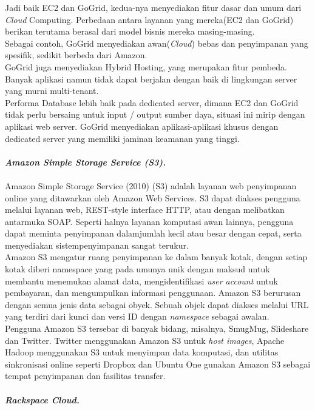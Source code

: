 Jadi baik EC2 dan GoGrid, kedua-nya menyediakan fitur dasar dan umum dari \textit{Cloud} Computing. Perbedaan antara layanan yang mereka(EC2 dan  GoGrid)  berikan  terutama berasal dari model bisnis mereka masing-masing.\\
Sebagai contoh, GoGrid menyediakan awan(\textit{Cloud}) bebas dan penyimpanan yang spesifik, sedikit berbeda dari Amazon.\\
\tab GoGrid juga menyediakan Hybrid Hosting, yang merupakan fitur pembeda. Banyak aplikasi namun tidak dapat berjalan dengan baik di lingkungan server yang murni  multi-tenant.\\
Performa Database lebih baik pada dedicated server, dimana EC2 dan GoGrid tidak perlu bersaing untuk input / output sumber daya, situasi ini mirip dengan aplikasi web server. GoGrid menyediakan aplikasi-aplikasi khusus dengan dedicated server  yang memiliki  jaminan keamanan yang tinggi.\\\\
\textbf{\textit{Amazon Simple Storage Service (S3).}}\\\\
Amazon Simple Storage Service (2010) (S3) adalah layanan web penyimpanan online yang ditawarkan oleh Amazon Web Services. S3 dapat diakses pengguna melalui layanan web, REST-style interface HTTP, atau dengan melibatkan antarmuka SOAP. Seperti halnya layanan komputasi awan lainnya, pengguna dapat meminta penyimpanan dalamjumlah kecil atau besar dengan cepat, serta menyediakan sistempenyimpanan sangat  terukur.\\
\tab Amazon S3 mengatur ruang penyimpanan ke dalam banyak kotak, dengan setiap kotak diberi namespace yang pada umunya unik dengan maksud untuk membantu menemukan  alamat data, mengidentifikasi \textit{user account} untuk pembayaran, dan mengumpulkan informasi penggunaan. Amazon S3 berurusan dengan semua jenis data sebagai obyek. Sebuah objek dapat diakses melalui URL yang terdiri dari kunci dan versi ID dengan \textit{namespace} sebagai awalan.\\
Pengguna Amazon S3 tersebar di banyak bidang, misalnya, SmugMug, Slideshare dan Twitter. Twitter menggunakan Amazon S3 untuk \textit{host images}, Apache Hadoop menggunakan S3 untuk menyimpan data komputasi, dan utilitas sinkronisasi online seperti Dropbox dan Ubuntu One gunakan Amazon S3 sebagai  tempat penyimpanan dan fasilitas transfer.\\\\
\textbf{\textit{Rackspace Cloud.}}\\\\

